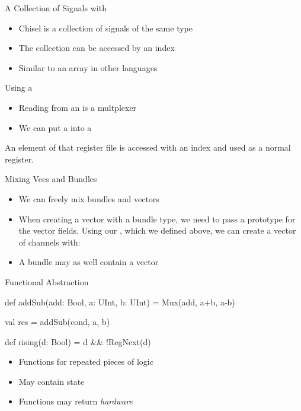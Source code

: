 \begin{frame}[fragile]{A Collection of Signals with }
\begin{itemize}
\item Chisel  is a collection of signals of the same type
\item The collection can be accessed by an index
\item Similar to an array in other languages
\end{itemize}
\end{frame}

\begin{frame}[fragile]{Using a }
\begin{itemize}
\item Reading from an  is a multplexer
\item We can put a  into a 
\end{itemize}
\noindent An element of that register file is accessed with an index and used as a normal register.

\end{frame}


\begin{frame}[fragile]{Mixing Vecs and Bundles}
\begin{itemize}
\item We can freely mix bundles and vectors
\item When creating a vector with a bundle
type, we need to pass a prototype for the vector fields. Using our
, which we defined above, we can create a vector of channels with:
\end{itemize}
\begin{itemize}
\item A bundle may as well contain a vector
\end{itemize}
\end{frame}


\begin{frame}[fragile]{Functional Abstraction}
\begin{chisel}
  def addSub(add: Bool, a: UInt, b: UInt) =
    Mux(add, a+b, a-b)

  val res = addSub(cond, a, b)
  
  def rising(d: Bool) = d && !RegNext(d)
\end{chisel}
\begin{itemize}
\item Functions for repeated pieces of logic
\item May contain state
\item Functions may return \emph{hardware}
\end{itemize}
\end{frame}

